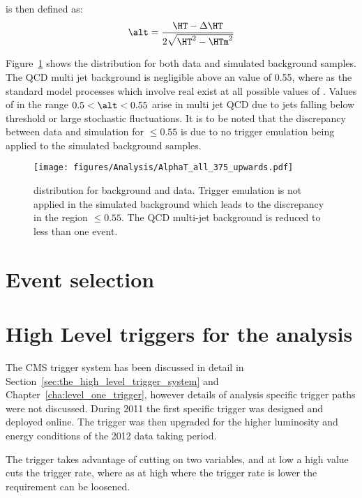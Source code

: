 \alt is then defined as:
\begin{equation}
  \alt = \frac{\HT - \Delta\HT}{2\sqrt{\HT^{2}-\HTm^{2}}}
\end{equation}


Figure~\ref{fig:figures_Analysis_AlphaT_all_375_upwards} shows the \alt 
distribution for both data and simulated background samples. The QCD multi jet 
background is negligible above an \alt value of 0.55, where as the standard 
model processes which involve real \MET exist at all possible values of \alt.
Values of \alt in the range $0.5 < \alt < 0.55$ arise in multi jet QCD due to 
jets falling below threshold or large stochastic fluctuations.
It is to be noted that the discrepancy between data and simulation for \alt 
$\leq 0.55$ is due to no trigger emulation being applied to the simulated 
background samples.
\begin{figure}[ht!]
  \centering  \texttt{[image: figures/Analysis/AlphaT\_all\_375\_upwards.pdf]}
  \caption{\alt distribution for background and data. Trigger emulation is not 
  applied in the simulated background which leads to the discrepancy in the 
  region \alt $\leq 0.55$. The QCD multi-jet background is reduced to less than 
  one event.}
  \label{fig:figures_Analysis_AlphaT_all_375_upwards}
\end{figure}


\section{Event selection} %
\label{sec:event_selection}


\section{High Level triggers for the \alt analysis} %
\label{sec:high_level_triggers_for_the_alt_analysis}
The CMS trigger system has been discussed in detail in 
Section~\ref{sec:the_high_level_trigger_system} and 
Chapter~\ref{cha:level_one_trigger}, however details of analysis specific 
trigger paths were not discussed. During 2011 the first \alt specific trigger 
was designed and deployed online. The trigger was then upgraded for the higher 
luminosity and energy conditions of the 2012 data taking period.


The trigger takes advantage of cutting on two variables, \HT and \alt at low 
\HT a high \alt value cuts the trigger rate, where as at high \HT where the
trigger rate is lower the \alt requirement can be loosened.

